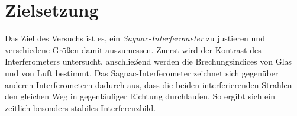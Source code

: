 \section{Zielsetzung}
Das Ziel des Versuchs ist es, ein \textit{Sagnac-Interferometer} zu justieren und verschiedene Größen damit auszumessen.
Zuerst wird der Kontrast des Interferometers untersucht, anschließend werden die Brechungsindices von Glas und von Luft bestimmt.
Das Sagnac-Interferometer zeichnet sich gegenüber anderen Interferometern dadurch aus, dass die beiden interferierenden Strahlen den gleichen Weg in gegenläufiger Richtung durchlaufen.
So ergibt sich ein zeitlich besonders stabiles Interferenzbild.
